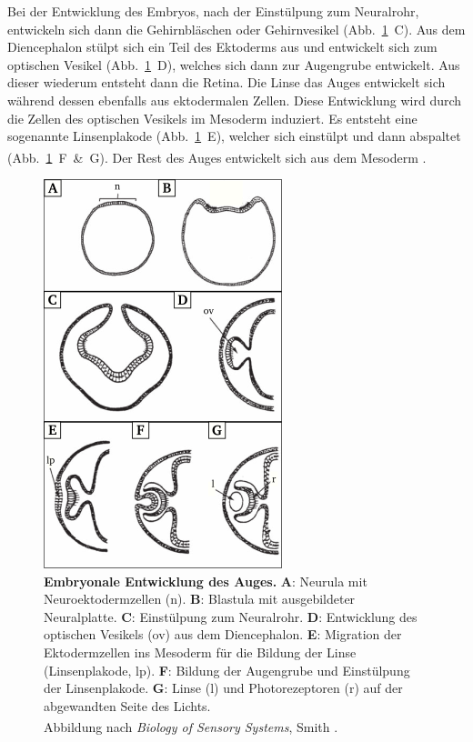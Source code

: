 \documentclass[12pt,a4paper,pdftex]{article}
\begin{document}
Bei der Entwicklung des Embryos, nach der Einstülpung zum Neuralrohr, entwickeln sich dann die Gehirnbläschen oder Gehirnvesikel (Abb.~\ref{fig:eye_neurulation}~C). Aus dem Diencephalon stülpt sich ein Teil des Ektoderms aus und entwickelt sich zum optischen Vesikel (Abb.~\ref{fig:eye_neurulation}~D), welches sich dann zur Augengrube  entwickelt. Aus dieser wiederum entsteht dann die Retina. Die Linse das Auges entwickelt sich während dessen ebenfalls aus ektodermalen Zellen. Diese Entwicklung wird durch die Zellen des optischen Vesikels  im Mesoderm induziert. Es entsteht eine sogenannte Linsenplakode  (Abb.~\ref{fig:eye_neurulation}~E), welcher sich einstülpt und dann abspaltet (Abb.~\ref{fig:eye_neurulation}~F~\&~G). Der Rest des Auges entwickelt sich aus dem Mesoderm \textsuperscript{\cite[16]{smith2008biology}}.

\begin{figure}[H]
    \centering
    \includegraphics{pictures/visual/Eye_Neurulation.png}
    \caption[Embryonale Entwicklung des Auges]{\textbf{Embryonale Entwicklung des Auges.} \textbf{A}: Neurula mit Neuroektodermzellen (n). \textbf{B}: Blastula mit ausgebildeter Neuralplatte. \textbf{C}: Einstülpung zum Neuralrohr. \textbf{D}: Entwicklung des optischen Vesikels (ov) aus dem Diencephalon. \textbf{E}: Migration der Ektodermzellen ins Mesoderm für die Bildung der Linse (Linsenplakode, lp). \textbf{F}: Bildung der Augengrube und Einstülpung der Linsenplakode. \textbf{G}: Linse (l) und Photorezeptoren (r) auf der abgewandten Seite des Lichts.\\
    Abbildung nach \textit{Biology of Sensory Systems}, Smith \textsuperscript{\cite[16]{smith2008biology}}.}
    \label{fig:eye_neurulation}
\end{figure}
\end{document}
